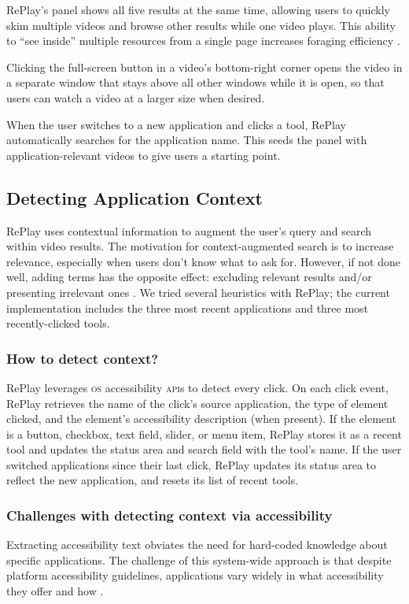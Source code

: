 RePlay's panel shows all five results at the same time, allowing users to quickly skim multiple videos and browse other results while one video plays. This ability to ``see inside'' multiple resources from a single page increases foraging efficiency \cite{Vermette2017, Glassman2016DocMatrix, Pavel2013}. 

Clicking the full-screen button in a video's bottom-right corner opens the video in a separate window that stays above all other windows while it is open, so that users can watch a video at a larger size when desired.

When the user switches to a new application and clicks a tool, RePlay automatically searches for the application name. This seeds the panel with application-relevant videos to give users a starting point.

\subsection{Detecting Application Context}
RePlay uses contextual information to augment the user's query and search within video results. The motivation for context-augmented search is to increase relevance, especially when users don't know what to ask for. However, if not done well, adding terms has the opposite effect: excluding relevant results and/or presenting irrelevant ones \cite{Finkelstein2002}. We tried several heuristics with RePlay; the current implementation includes the three most recent applications and three most recently-clicked tools.

\subsubsection{How to detect context?}
RePlay leverages \textsc{os} accessibility \textsc{api}s to detect every click. On each click event, RePlay retrieves the name of the click's source application, the type of element clicked, and the element's accessibility description (when present). If the element is a button, checkbox, text field, slider, or menu item, RePlay stores it as a recent tool and updates the status area and search field with the tool's name. If the user switched applications since their last click, RePlay updates its status area to reflect the new application, and resets its list of recent tools.

\subsubsection{Challenges with detecting context via accessibility}
Extracting accessibility text obviates the need for hard-coded knowledge about specific applications. The challenge of this system-wide approach is that despite platform accessibility guidelines, applications vary widely in what accessibility they offer and how \cite{Hurst2010}.

